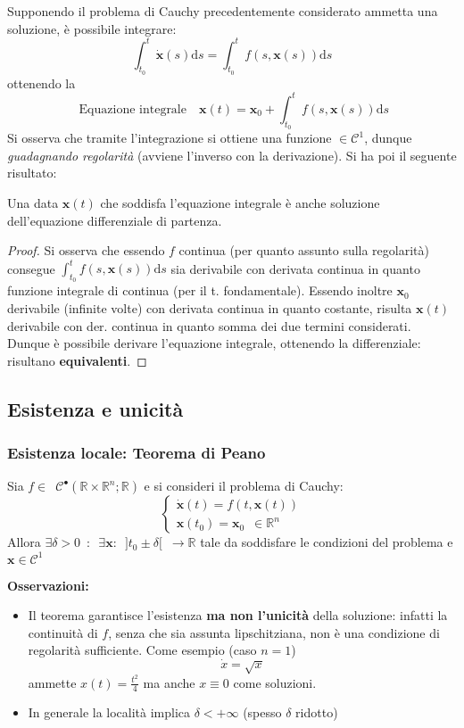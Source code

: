 \documentclass[10pt]{article}
\theoremstyle{plain}
\begin{document}
Supponendo il problema di Cauchy precedentemente considerato ammetta una soluzione, è possibile integrare:
\[\int_{t_0}^{t}\dot{\mathbf{x}}(s)\textrm{d}s = \int_{t_0}^{t}f(s, \mathbf{x}(s))\textrm{d}s\]
ottenendo la
\[\boxed{\textrm{ Equazione integrale} \quad \mathbf{x}(t) = \mathbf{x}_0 + \int_{t_0}^{t}f(s, \mathbf{x}(s))\textrm{d}s }\]
Si osserva che tramite l'integrazione si ottiene una funzione $\in \mathcal{C}^1$, dunque \textit{guadagnando regolarità} (avviene l'inverso con la derivazione). Si ha poi il seguente risultato:
\begin{prop}
Una data $\mathbf{x}(t)$ che soddisfa l'equazione integrale è anche soluzione dell'equazione differenziale di partenza.
\end{prop}
\begin{proof}
Si osserva che essendo $f$ continua (per quanto assunto sulla regolarità) consegue $\displaystyle \int_{t_0}^{t}f(s, \mathbf{x}(s))\textrm{d}s$ sia derivabile con derivata continua in quanto funzione integrale di continua (per il t. fondamentale). Essendo inoltre $\mathbf{x}_0$ derivabile (infinite volte) con derivata continua in quanto costante, risulta $\mathbf{x}(t)$ derivabile con der. continua in quanto somma dei due termini considerati. Dunque è possibile derivare l'equazione integrale, ottenendo la differenziale: risultano \textbf{equivalenti}.
\end{proof}

\subsection{Esistenza e unicità}
\subsubsection{Esistenza locale: Teorema di Peano}
\begin{ther}
Sia $f \in \enspace \mathcal{C}^{•}(\mathbb{R} \times \mathbb{R}^n; \mathbb{R})$ e si consideri il problema di Cauchy:
\[\begin{cases}
\dot{\mathbf{x}}(t) = f(t, \mathbf{x}(t))\\
\mathbf{x}(t_0) = \mathbf{x}_0 \enspace \in \mathbb{R}^n
\end{cases}\]
Allora $\exists \delta > 0 \enspace : \enspace \exists \mathbf{x} : \enspace ]t_0 \pm \delta[ \enspace \rightarrow \mathbb{R}$ tale da soddisfare le condizioni del problema e $\mathbf{x} \in \mathcal{C}^1$
\end{ther}
\textbf{Osservazioni:}
\begin{itemize}
\item Il teorema garantisce l'esistenza \textbf{ma non l'unicità} della soluzione: infatti la continuità di $f$, senza che sia assunta lipschitziana, non è una condizione di regolarità sufficiente. Come esempio (caso $n=1$)
\[\dot{x} = \sqrt{x}\]
ammette $\displaystyle x(t) = \frac{t^2}{4}$ ma anche $x \equiv 0$ come soluzioni.
\item In generale la località implica $\delta < + \infty$ (spesso $\delta$ ridotto)
\end{itemize}
\end{document}
